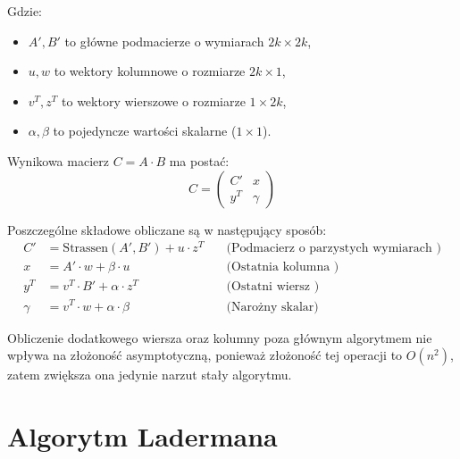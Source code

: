 \documentclass[twoside]{article}
\begin{document}
Gdzie:
\begin{itemize}
    \item $A', B'$ to główne podmacierze o wymiarach $2k \times 2k$,
    \item $u, w$ to wektory kolumnowe o rozmiarze $2k \times 1$,
    \item $v^T, z^T$ to wektory wierszowe o rozmiarze $1 \times 2k$,
    \item $\alpha, \beta$ to pojedyncze wartości skalarne ($1 \times 1$).
\end{itemize}

Wynikowa macierz $C = A \cdot B$ ma postać:
\begin{equation*}
C = \begin{pmatrix} C' & x \\ y^T & \gamma \end{pmatrix}
\end{equation*}

Poszczególne składowe obliczane są w następujący sposób:
\begin{align*}
    C' &= \text{Strassen}(A', B') + u \cdot z^T \quad &\text{(Podmacierz o parzystych wymiarach )} \\
    x &= A' \cdot w + \beta \cdot u \quad &\text{(Ostatnia kolumna )} \\
    y^T &= v^T \cdot B' + \alpha \cdot z^T \quad &\text{(Ostatni wiersz )} \\
    \gamma &= v^T \cdot w + \alpha \cdot \beta \quad &\text{(Narożny skalar)}
\end{align*}

Obliczenie dodatkowego wiersza oraz kolumny poza głównym algorytmem nie wpływa na złożoność asymptotyczną, ponieważ złożoność tej operacji to $O(n^2)$, zatem
zwiększa ona jedynie narzut stały algorytmu.

\section{Algorytm Ladermana}
\end{document}
